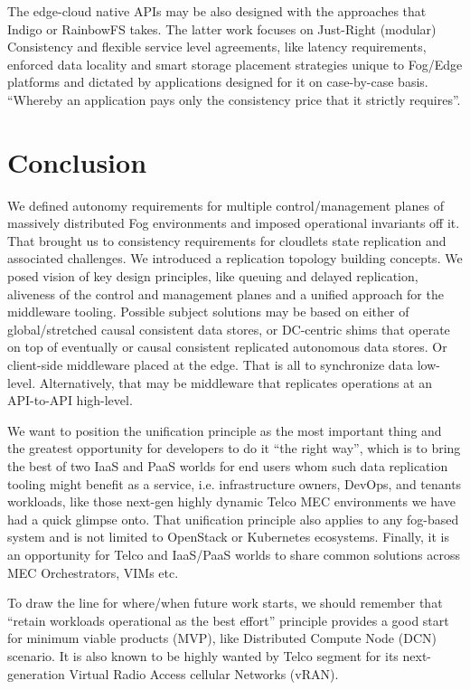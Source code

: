 \documentclass[conference]{IEEEtran}
\begin{document}
The edge-cloud native APIs may be also designed with the approaches that
Indigo\cite{b10} or RainbowFS\cite{b7} takes. The latter work focuses on
Just-Right (modular) Consistency and flexible service level agreements, like
latency requirements, enforced data locality and smart storage placement
strategies unique to Fog/Edge platforms and dictated by applications designed
for it on case-by-case basis. ``Whereby an application pays only the
consistency price that it strictly requires''\cite{b7}.

\section{Conclusion}
We defined autonomy requirements for multiple control/management planes of
massively distributed Fog environments and imposed operational invariants off
it. That brought us to consistency requirements for cloudlets state replication
and associated challenges. We introduced a replication topology building
concepts. We posed vision of key design principles, like queuing and delayed
replication, aliveness of the control and management planes and a unified
approach for the middleware tooling. Possible subject solutions may be based on
either of global/stretched causal consistent data stores, or DC-centric shims
that operate on top of eventually or causal consistent replicated autonomous
data stores. Or client-side middleware placed at the edge. That is all to
synchronize data low-level. Alternatively, that may be middleware that
replicates operations at an API-to-API high-level.

We want to position the unification principle as the most important thing and
the greatest opportunity for developers to do it ``the right way'', which is to
bring the best of two IaaS and PaaS worlds for end users whom such data
replication tooling might benefit as a service, i.e. infrastructure owners,
DevOps, and tenants workloads, like those next-gen highly dynamic Telco MEC
environments we have had a quick glimpse onto. That unification principle also
applies to any fog-based system and is not limited to OpenStack or Kubernetes
ecosystems. Finally, it is an opportunity for Telco and IaaS/PaaS worlds to
share common solutions across MEC Orchestrators, VIMs etc.

To draw the line for where/when future work starts, we should remember
that ``retain workloads operational as the best effort'' principle provides a
good start for minimum viable products (MVP), like Distributed Compute Node
(DCN) scenario. It is also known to be highly wanted by Telco segment for its
next-generation Virtual Radio Access cellular Networks (vRAN).
\end{document}
